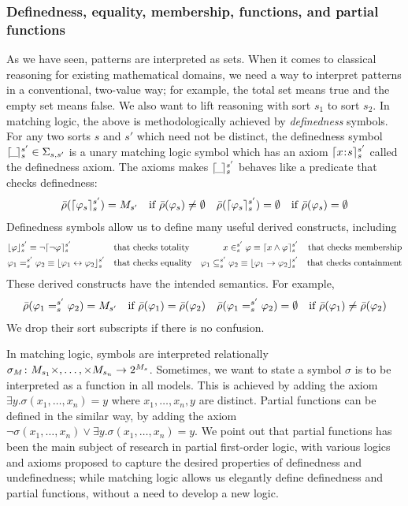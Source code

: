 \documentclass{amsart}
\begin{document}
\subsubsection{Definedness, equality, membership, functions, and partial 
functions}

As we have seen, patterns are interpreted as sets.
When it comes to classical reasoning for existing mathematical domains,
we need a way to interpret patterns in a conventional, two-value way;
for example, the total set means true and the empty set means false.
We also want to lift reasoning with sort $s_1$ to sort $s_2$.
In matching logic, the above is methodologically achieved by
\emph{definedness} symbols.
For any two sorts $s$ and $s'$ which need not be distinct, 
the definedness symbol
$\lceil{\!\_\!}\rceil_{s}^{s'} \in \Sigma_{s,s'}$
is a unary matching logic symbol which has an axiom
$
\lceil x \mathbin{\!:\!} s\rceil_{s}^{s'}
$
called the definedness axiom. 
The axioms makes $\lceil{\!\_\!}\rceil_{s}^{s'}$ behaves like a predicate
that checks definedness:
\begin{align*}
& \bar{\rho}(\lceil\varphi_s\rceil_{s}^{s'}) = M_{s'}
  \quad \text{if $\bar{\rho}(\varphi_s) \neq \emptyset$}
& \bar{\rho}(\lceil\varphi_s\rceil_{s}^{s'}) = \emptyset
  \quad \text{if $\bar{\rho}(\varphi_s) = \emptyset$}
\end{align*}
Definedness symbols allow us to define many useful derived constructs, including\begin{align*}
&\lfloor\varphi\rfloor_s^{s'} \equiv \neg \lceil\neg \varphi\rceil_s^{s'}
&& \text{that checks totality}
&x \in_s^{s'} \varphi \equiv \lceil x \wedge \varphi\rceil_s^{s'}
&& \text{that checks membership}
\\
&\varphi_1 =_s^{s'} \varphi_2 \equiv \lfloor\varphi_1 \leftrightarrow \varphi_2\rfloor_s^{s'}
&& \text{that checks equality}
&\varphi_1 \subseteq_s^{s'} \varphi_2 
\equiv \lfloor\varphi_1 \to \varphi_2\rfloor_s^{s'}
&& \text{that checks containment}
\end{align*}
These derived constructs have the intended semantics.
For example,
\begin{align*}
& \bar{\rho}(\varphi_1 =_{s}^{s'} \varphi_2) = M_{s'}
  \quad \text{if $\bar{\rho}(\varphi_1) = \bar{\rho}(\varphi_2)$}
& \bar{\rho}(\varphi_1 =_{s}^{s'} \varphi_2) = \emptyset
  \quad \text{if $\bar{\rho}(\varphi_1) \neq \bar{\rho}(\varphi_2)$}
\end{align*}
We drop their sort subscripts if there is no confusion.

In matching logic, symbols are interpreted relationally
$\sigma_M \colon M_{s_1} \times ,\dots, \times M_{s_n} \to 2^{M_s}$.
Sometimes, we want to state a symbol $\sigma$ is to be interpreted
as a function in all models.
This is achieved by adding the axiom
$\exists y . \sigma(x_1 ,\dots, x_n) = y$
where $x_1 ,\dots, x_n , y$ are distinct.
Partial functions can be defined in the similar way, by adding the axiom
$\neg \sigma(x_1 ,\dots, x_n) \vee \exists y . \sigma(x_1 ,\dots, x_n) = y$.
We point out that partial functions has been the main subject of research
in partial first-order logic, with various logics and axioms proposed
to capture the desired properties of definedness and undefinedness;
while matching logic allows us elegantly define definedness and partial 
functions, without a need to develop a new logic.
\end{document}
